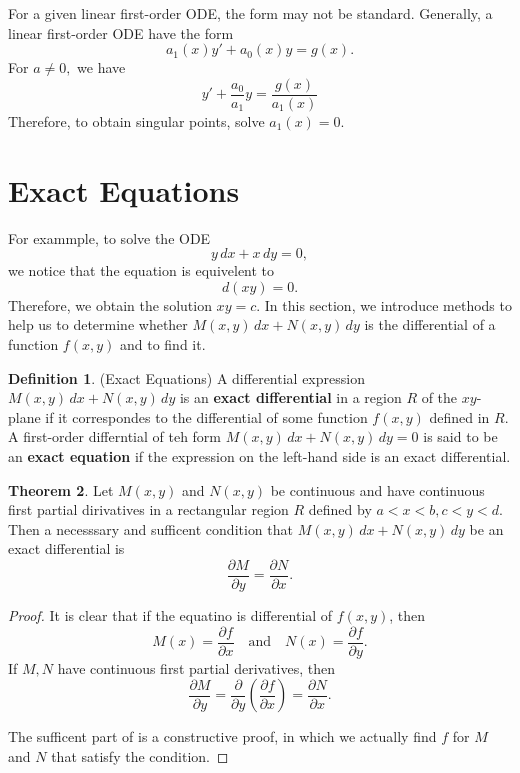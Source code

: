 \documentclass[12pt,a4paper]{report}
\theoremstyle{definition}
\newtheorem{theorem}{Theorem}[section]
\newtheorem{definition}[theorem]{Definition}
\theoremstyle{remark}
\begin{document}
For a given linear first-order ODE, the form may not be standard. Generally, a linear first-order ODE have the form 
\[a_1(x) y' + a_0(x) y = g(x).\]
For $a \neq 0,$ we have
\[y' + \frac{a_0}{a_1} y = \frac{g(x)}{a_1(x)}\]
Therefore, to obtain singular points, solve $a_1(x) = 0.$

\section{Exact Equations}

For exammple, to solve the ODE
\[y \, dx + x \, dy = 0,\]
we notice that the equation is equivelent to
\[d(xy) = 0.\]
Therefore, we obtain the solution $xy = c.$ In this section, we introduce methods to help us to determine whether $M(x, y) \, dx + N(x, y) \, dy$ is the differential of a function $f(x, y)$ and to find it. 

\begin{definition}(Exact Equations)
    A differential expression $M(x, y) \, dx + N(x, y) \, dy$ is an \textbf{exact differential} in a region $R$ of the $xy$-plane if it correspondes to the differential of some function $f(x, y)$ defined in $R$. A first-order differntial of teh form $M(x, y)\,dx + N(x, y)\,dy = 0$ is said to be an \textbf{exact equation} if the expression on the left-hand side is an exact differential.
\end{definition}

\begin{theorem}
    Let $M(x, y)$ and $N(x, y)$ be continuous and have continuous first partial dirivatives in a rectangular region $R$ defined by $a < x < b, c < y < d.$ Then a necesssary and sufficent condition that $M(x, y) \, dx + N(x, y) \, dy$ be an exact differential is 
    \[\frac{\partial M}{\partial y} = \frac{\partial N}{\partial x}.\]
\end{theorem}

\begin{proof}
    It is clear that if the equatino is differential of $f(x, y)$, then
    \[M(x) = \frac{\partial f}{\partial x} \quad \text{and} \quad N(x) = \frac{\partial f}{\partial y}.\]
    If $M, N$ have continuous first partial derivatives, then 
    \[\frac{\partial M}{\partial y} = \frac{\partial}{\partial y}\left(\frac{\partial f}{\partial x}\right) = \frac{\partial N}{\partial x}.\]

    The sufficent part of is a constructive proof, in which we actually find $f$ for $M$ and $N$ that satisfy the condition.
\end{proof}
\end{document}
